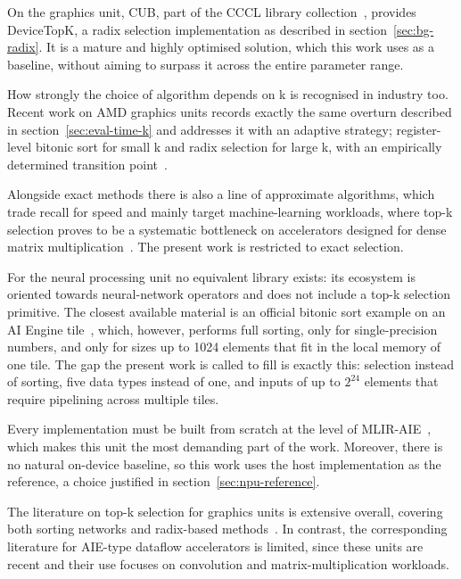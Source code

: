 On the graphics unit, CUB, part of the CCCL library collection~\cite{cccl},
provides DeviceTopK, a radix selection implementation as described in
section~\ref{sec:bg-radix}. It is a mature and highly optimised solution, which
this work uses as a baseline, without aiming to surpass it across the entire
parameter range.

How strongly the choice of algorithm depends on k is recognised in industry
too. Recent work on AMD graphics units records exactly the same overturn
described in section~\ref{sec:eval-time-k} and addresses it with an adaptive
strategy; register-level bitonic sort for small k and radix selection for large
k, with an empirically determined transition point~\cite{lin2026adaptivetopk}.

Alongside exact methods there is also a line of approximate algorithms, which
trade recall for speed and mainly target machine-learning workloads, where
top-k selection proves to be a systematic bottleneck on accelerators designed
for dense matrix multiplication~\cite{samaga2026}. The present work is
restricted to exact selection.

For the neural processing unit no equivalent library exists: its ecosystem is
oriented towards neural-network operators and does not include a top-k
selection primitive. The closest available material is an official bitonic sort
example on an AI Engine tile~\cite{amd2024bitonicaie}, which, however, performs
full sorting, only for single-precision numbers, and only for sizes up to 1024
elements that fit in the local memory of one tile. The gap the present work is
called to fill is exactly this: selection instead of sorting, five data types
instead of one, and inputs of up to $2^{24}$ elements that require pipelining
across multiple tiles.

Every implementation must be built from scratch at the level of
MLIR-AIE~\cite{mliraie}, which makes this unit the most demanding part of the
work. Moreover, there is no natural on-device baseline, so this work uses the
host implementation as the reference, a choice justified in
section~\ref{sec:npu-reference}.

The literature on top-k selection for graphics units is extensive overall,
covering both sorting networks and radix-based
methods~\cite{sismanis2012,lin2026adaptivetopk}. In contrast, the corresponding
literature for AIE-type dataflow accelerators is limited, since these units are
recent and their use focuses on convolution and matrix-multiplication
workloads.
